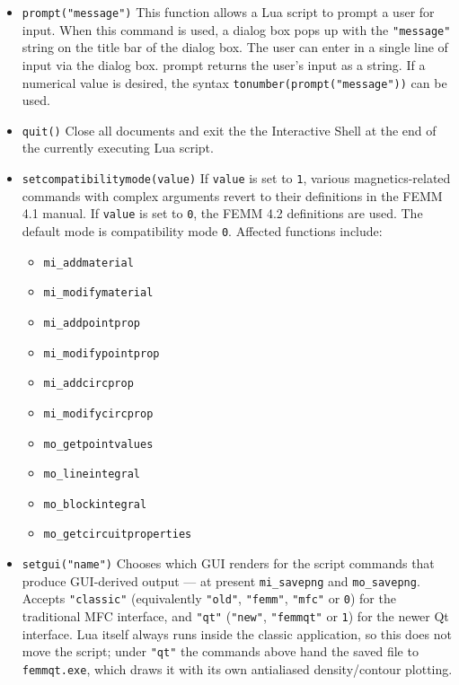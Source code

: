 \begin{itemize}
\item \texttt{prompt("message")} This function allows a Lua script to prompt a
user for input. When this command is used, a dialog box pops up with the
\texttt{"message"} string on the title bar of the dialog box. The user can
enter in a single line of input via the dialog box. prompt returns the
user's input as a string. If a numerical value is desired, the syntax
\texttt{tonumber(prompt("message"))} can be used.

\item {\tt quit()} Close all documents and exit the the Interactive
Shell at the end of the currently executing Lua script.

\item {\tt setcompatibilitymode(value)} If {\tt value} is set to {\tt 1}, various magnetics-related
commands with complex arguments revert to their definitions in the FEMM 4.1 manual.  If {\tt value} is
set to {\tt 0}, the FEMM 4.2 definitions are used.  The default mode is compatibility mode {\tt 0}. Affected functions include:
\begin{itemize}
\item {\tt mi\_addmaterial}
\item {\tt mi\_modifymaterial}
\item {\tt mi\_addpointprop}
\item {\tt mi\_modifypointprop}
\item {\tt mi\_addcircprop}
\item {\tt mi\_modifycircprop}
\item {\tt mo\_getpointvalues}
\item {\tt mo\_lineintegral}
\item {\tt mo\_blockintegral}
\item {\tt mo\_getcircuitproperties}
\end{itemize}

\item {\tt setgui("name")} Chooses which GUI renders for the script
commands that produce GUI-derived output --- at present {\tt mi\_savepng}
and {\tt mo\_savepng}. Accepts {\tt "classic"} (equivalently {\tt "old"},
{\tt "femm"}, {\tt "mfc"} or {\tt 0}) for the traditional MFC interface,
and {\tt "qt"} ({\tt "new"}, {\tt "femmqt"} or {\tt 1}) for the newer Qt
interface. Lua itself always runs inside the classic application, so this
does not move the script; under {\tt "qt"} the commands above hand the
saved file to {\tt femmqt.exe}, which draws it with its own antialiased
density/contour plotting.


\end{itemize}
